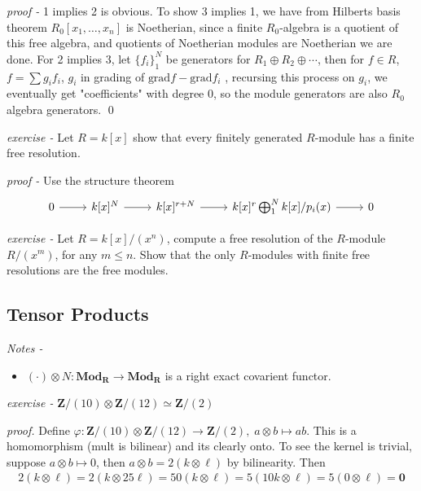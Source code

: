 \documentclass[11pt]{article}
\theoremstyle{definition}
\newcommand{\set}[1]{\{#1\}}
\begin{document}
    \emph{proof - } 1 implies 2 is obvious. To show 3 implies 1, we have from Hilberts basis theorem \(R_0[x_1,\hdots,x_n]\) is Noetherian, since a finite \(R_0\)-algebra is a quotient of this free algebra, and quotients of Noetherian modules are Noetherian we are done. For 2 implies 3, let \(\set{f_i}_1^N\) be generators for \(R_1 \oplus R_2 \oplus \cdots\), then for \(f \in R\), \(f = \sum g_i f_i\), \(g_i\) in grading of \(\text{grad} f - \text{grad} f_i\) , recursing this process on \(g_i\), we eventually get "coefficients" with degree \(0\), so the module generators are also \(R_0\) algebra generators. \qed

    \emph{exercise - } Let \(R = k[x]\) show that every finitely generated \(R\)-module has a finite free resolution.

    \emph{proof - } Use the structure theorem
    \begin{equation*}
        \begin{tikzcd}
        0 \arrow[r] &k[x]^N \arrow[r] &k[x]^{r+N} \arrow[r]&  k[x]^r \bigoplus_1^N k[x]/p_i(x) \arrow[r] &0
        \end{tikzcd}
    \end{equation*}

    \emph{exercise - } Let \(R = k[x]/(x^n)\), compute a free resolution of the \(R\)-module \(R/(x^m)\), for any \(m \leq n\). Show that the only \(R\)-modules with finite
    free resolutions are the free modules. 

    \subsection{Tensor Products}

    \emph{Notes - }
    \begin{itemize}
        \item \((\cdot) \otimes N: \textbf{Mod}_\mathbf{R} \to \textbf{Mod}_\mathbf{R}\) is a right exact covarient functor.
    \end{itemize}

    \emph{exercise - } \(\mathbf{Z}/(10)\otimes \mathbf{Z}/(12) \simeq \mathbf{Z}/(2)\)

    \emph{proof.} Define \(\varphi: \mathbf{Z}/(10)\otimes \mathbf{Z}/(12) \to \mathbf{Z}/(2), \; a\otimes b \mapsto ab\). This is a homomorphism (mult is bilinear) and its clearly onto.
    To see the kernel is trivial, suppose \(a \otimes b \mapsto 0\), then \(a \otimes b = 2 (k \otimes \ell)\) by bilinearity. Then
    \begin{align*}
        2 (k \otimes \ell) = 2 (k \otimes 25\ell) = 50 (k \otimes \ell) = 5 (10k \otimes \ell) = 5(0 \otimes \ell) = \mathbf{0}
    \end{align*}
\end{document}
